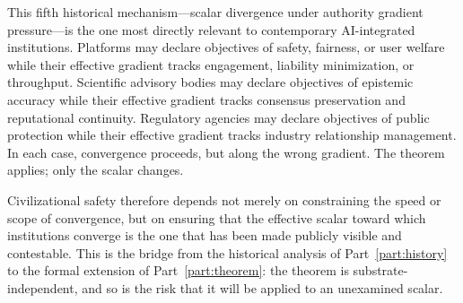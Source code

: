 \documentclass[12pt, oneside]{book}
\theoremstyle{plain}
\theoremstyle{definition}
\theoremstyle{remark}
\theoremstyle{definition}
\begin{document}
This fifth historical mechanism---scalar divergence under authority gradient
pressure---is the one most directly relevant to contemporary AI-integrated
institutions. Platforms may declare objectives of safety, fairness, or user welfare
while their effective gradient tracks engagement, liability minimization, or
throughput. Scientific advisory bodies may declare objectives of epistemic accuracy
while their effective gradient tracks consensus preservation and reputational
continuity. Regulatory agencies may declare objectives of public protection while
their effective gradient tracks industry relationship management. In each case,
convergence proceeds, but along the wrong gradient. The theorem applies; only the
scalar changes.

Civilizational safety therefore depends not merely on constraining the speed or
scope of convergence, but on ensuring that the effective scalar toward which
institutions converge is the one that has been made publicly visible and contestable.
This is the bridge from the historical analysis of Part~\ref{part:history} to the
formal extension of Part~\ref{part:theorem}: the theorem is substrate-independent,
and so is the risk that it will be applied to an unexamined scalar.
\end{document}
